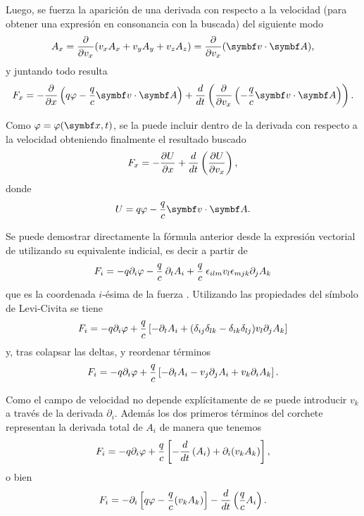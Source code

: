 \documentclass[10pt,oneside]{CBFT_book}
\begin{document}
Luego, se fuerza la aparición de una derivada con respecto a la velocidad (para obtener una expresión en consonancia con la buscada)
del siguiente modo
\[
	A_x = \dpar{}{v_x}(v_xA_x + v_yA_y + v_zA_z) = \dpar{}{v_x}(\pe{v}{A}),
\]
y juntando todo resulta
\[
	F_x = -\dpar{ }{ x }\left( q\vp - \frac{q}{c} \pe{v}{A} \right) 
	+ \dtot{ }{t} \left( \dpar{}{v_x}\left( -\frac{q}{c}\pe{v}{A} \right) \right) .
\]

Como $\vp=\vp(\vb{x},t)$, se la puede incluir dentro de la derivada con respecto a la velocidad obteniendo finalmente el 
resultado buscado
\[
	F_x = -\frac{\partial^{\hspace{-0.05em}} { U }}{\partial { x }^{\hspace{-0.05em}}} + \frac{d^{\hspace{-0.05em}} { }}{d {t}^{\hspace{-0.05em}}}\left( \frac{\partial^{\hspace{-0.05em}} {U}}{\partial {v_x}^{\hspace{-0.05em}}} \right),
\]
donde 
\[
	U = q \vp - \frac{q}{c} \pe{v}{A}.
\]
 

Se puede demostrar directamente la fórmula anterior desde la expresión vectorial de  utilizando su equivalente 
indicial, es decir a partir de
\[
	F_i = -q \partial_i \varphi - \frac{q}{c} \:\partial_t A_i + \frac{q}{c} \: \epsilon_{ilm} v_l \epsilon_{mjk} 
	\partial_j A_k
\]
que es la coordenada $i$-ésima de la fuerza . Utilizando las propiedades del símbolo de Levi-Civita se tiene 
\[
	F_i = -q \partial_i \varphi + \frac{q}{c} \left[  -\partial_t A_i  + (\delta_{ij}\delta_{lk} - \delta_{ik}\delta_{lj}) v_l \partial_j A_k \right]
\]
y, tras colapsar las deltas, y reordenar términos
\[
	F_i = -q \partial_i \varphi + \frac{q}{c} \left[  -\partial_t A_i - v_j \partial_j A_i +  v_k \partial_i A_k  \right].
\]

Como el campo de velocidad  no depende explícitamente de  se puede introducir $v_k$ a través de la derivada $\partial_i$. Además los
dos primeros términos del corchete representan la derivada total de $A_i$ de manera que tenemos
\[
	F_i = -q \partial_i \varphi + \frac{q}{c} \left[  - \frac{d^{\hspace{-0.05em}} {}}{d {t}^{\hspace{-0.05em}}} \left(A_i\right)  + \partial_i (v_k A_k)  \right],
\]
o bien 
\[
	F_i = - \partial_i \left[ q\varphi - \frac{q}{c}  (v_k A_k) \right] -  \frac{d^{\hspace{-0.05em}} {}}{d {t}^{\hspace{-0.05em}}} \left( \frac{q}{c} A_i \right).
\]
\end{document}
